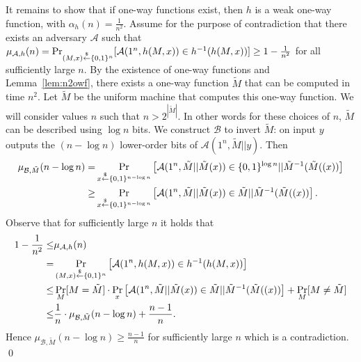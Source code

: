 \documentclass[12pt]{tufte-book}
\providecommand{\DIFdelbegin}{} %
\providecommand{\DIFdelend}{} %
\newcommand{\DIFscaledelfig}{0.5}
\newlength{\DIFdelgraphicswidth} %
\newlength{\DIFdelgraphicsheight} %
\newcommand{\DIFdelincludegraphics}[2][]{%
\sbox{\DIFdelgraphicsbox}{\DIFOincludegraphics[#1]{#2}}%
\settoboxwidth{\DIFdelgraphicswidth}{\DIFdelgraphicsbox} %
\settoboxtotalheight{\DIFdelgraphicsheight}{\DIFdelgraphicsbox} %
\scalebox{\DIFscaledelfig}{%
\parbox[b]{\DIFdelgraphicswidth}{\usebox{\DIFdelgraphicsbox}\\[-\baselineskip] \rule{\DIFdelgraphicswidth}{0em}}\llap{\resizebox{\DIFdelgraphicswidth}{\DIFdelgraphicsheight}{%
\setlength{\unitlength}{\DIFdelgraphicswidth}%
\begin{picture}(1,1)%
\thicklines\linethickness{2pt} %
{\color[rgb]{1,0,0}\put(0,0){\framebox(1,1){}}}%
{\color[rgb]{1,0,0}\put(0,0){\line( 1,1){1}}}%
{\color[rgb]{1,0,0}\put(0,1){\line(1,-1){1}}}%
\end{picture}%
}\hspace*{3pt}}} %
} %
\DeclareRobustCommand{\DIFdelbegin}{\DIFOdelbegin \let\includegraphics\DIFdelincludegraphics} %
\DeclareRobustCommand{\DIFdelend}{\DIFOaddend \let\includegraphics\DIFOincludegraphics} %
\begin{document}
It remains to show that if one-way functions exist, then $h$ is a weak one-way function, with $\alpha_h(n) = \frac{1}{n^2}$.
Assume for the purpose of contradiction that there exists an adversary $\mathcal{A}$ such that $\mu_{\mathcal{A},h}(n) = \Pr_{(M,x) \stackrel{\$}{\leftarrow} \{0,1\}^{n}}[ \mathcal{A}(1^{n}, h(M,x)) \in h^{-1}(h(M,x))]\geq 1-\frac{1}{n^2}$ for all sufficiently large $n$.
By the existence of one-way functions and Lemma~\ref{lem:n2owf}, there exists a one-way function $\tilde M$ that can be computed in time $n^2$. Let $\tilde M$ be the uniform machine that computes this one-way function.
We will consider values $n$ such that $n > 2^{|\tilde M|}$. In other words for these choices of $n$, $\tilde M$ can be described using $\log n$ bits.
We construct $\mathcal{B}$ to invert $\tilde M$: on input $y$ outputs the $(n-\log n)$ lower-order bits of $\mathcal{A}(1^n, \tilde M||y)$. Then
\begin{align*}
\mu_{\mathcal{B},\tilde M}(n-\log n) =& \Pr_{x \stackrel{\$}{\leftarrow} \{0,1\}^{n-\log n}}\left[\mathcal{A}(1^{n}, \tilde M || \tilde M(x)) \in \{0,1\}^{\log n} || \tilde M^{-1}(\tilde M((x))\right]\\
\geq& \Pr_{x \stackrel{\$}{\leftarrow} \{0,1\}^{n-\log n}}\left[\mathcal{A}(1^{n}, \tilde M || \tilde M(x)) \in \tilde{M} || \tilde M^{-1}(\tilde M((x))\right].
\end{align*}
Observe that for sufficiently large $n$ it holds that
\begin{align*}
1-\frac{1}{n^2} \leq& \mu_{\mathcal{A},h}(n)\\
=& \Pr_{(M,x) \stackrel{\$}{\leftarrow} \{0,1\}^{n}}\left[ \mathcal{A}(1^{n}, h(M,x)) \in h^{-1}(h(M,x))\right]\\
\leq& \Pr_{M }[M = \tilde M] \cdot \Pr_{x }\left[ \mathcal{A}(1^{n}, \tilde M||\tilde M(x)) \in  \tilde{M} || \tilde M^{-1}(\tilde M((x))\right] + \Pr_{M }[M \neq \tilde M]  \\
\leq&  \frac{1}{n} \cdot \mu_{\mathcal{B},\tilde M}(n-\log n) +\frac{n-1}{n}.
\end{align*}
Hence $\mu_{\mathcal{B},\tilde M}(n-\log n) \geq \frac{n-1}{n}$  for sufficiently large $n$ which is a contradiction.
\qed
\DIFdelbegin %
\DIFdelend 
\end{document}
